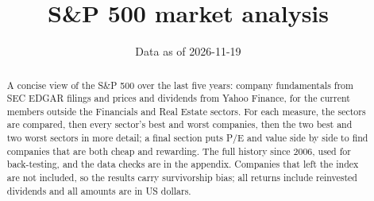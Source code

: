 \documentclass[11pt,a4paper]{article}
\title{S\&P 500 market analysis}
\author{Data as of 2026-11-19}
\date{}
\begin{document}
\maketitle
\begin{abstract}
A concise view of the S\&P 500 over the last five years: company fundamentals from SEC EDGAR filings and prices and dividends from Yahoo Finance, for the current members outside the Financials and Real Estate sectors. For each measure, the sectors are compared, then every sector's best and worst companies, then the two best and two worst sectors in more detail; a final section puts P/E and value side by side to find companies that are both cheap and rewarding. The full history since 2006, used for back-testing, and the data checks are in the appendix. Companies that left the index are not included, so the results carry survivorship bias; all returns include reinvested dividends and all amounts are in US dollars.
\end{abstract}
\tableofcontents
\newpage
\end{document}
